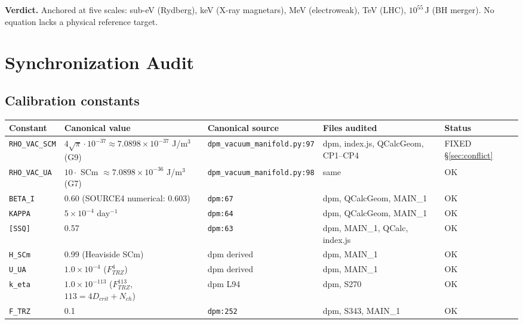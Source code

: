 \documentclass[11pt]{article}
\begin{document}
\textbf{Verdict.} Anchored at five scales: sub-eV (Rydberg), keV (X-ray magnetars), MeV (electroweak), TeV (LHC), $10^{55}$\,J (BH merger). No equation lacks a physical reference target.

\section{Synchronization Audit}

\subsection{Calibration constants}
\begin{longtable}{p{2.5cm}p{4.5cm}p{4cm}p{3cm}p{1.2cm}}
\toprule
Constant & Canonical value & Canonical source & Files audited & Status \\
\midrule \endhead
\texttt{RHO\_VAC\_SCM} & $4\sqrt{\pi}\cdot 10^{-37} \approx 7.0898\times10^{-37}$ J/m$^3$ (G9) & \texttt{dpm\_vacuum\_manifold.py:97} & dpm, index.js, QCalcGeom, CP1--CP4 & FIXED \S\ref{sec:conflict} \\
\texttt{RHO\_VAC\_UA} & $10 \cdot $ SCm $\approx 7.0898\times10^{-36}$ J/m$^3$ (G7) & \texttt{dpm\_vacuum\_manifold.py:98} & same & OK \\
\texttt{BETA\_I} & 0.60 (SOURCE4 numerical: 0.603) & \texttt{dpm:67} & dpm, QCalcGeom, MAIN\_1 & OK \\
\texttt{KAPPA} & $5\times10^{-4}$ day$^{-1}$ & \texttt{dpm:64} & dpm, QCalcGeom, MAIN\_1 & OK \\
\texttt{[SSQ]} & 0.57 & \texttt{dpm:63} & dpm, MAIN\_1, QCalc, index.js & OK \\
\texttt{H\_SCm} & 0.99 (Heaviside SCm) & dpm derived & dpm, MAIN\_1 & OK \\
\texttt{U\_UA} & $1.0\times10^{-4}$ ($F_{TRZ}^4$) & dpm derived & dpm, MAIN\_1 & OK \\
\texttt{k\_eta} & $1.0\times10^{-113}$ ($F_{TRZ}^{113}$, $113=4D_{crit}+N_{ch}$) & dpm L94 & dpm, S270 & OK \\
\texttt{F\_TRZ} & 0.1 & \texttt{dpm:252} & dpm, S343, MAIN\_1 & OK \\
\bottomrule
\end{longtable}
\end{document}

